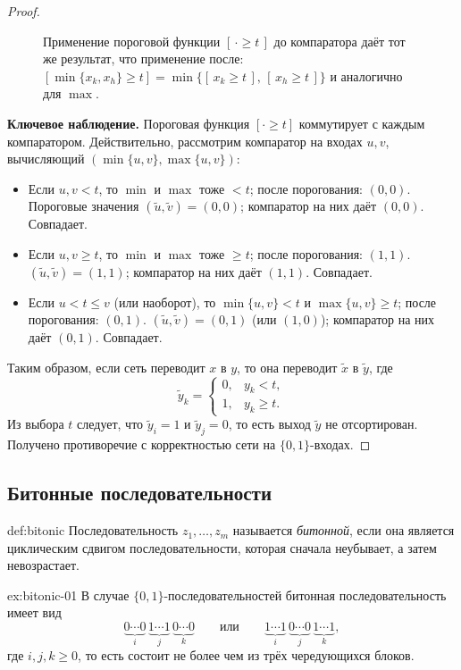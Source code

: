 \begin{proof}
\begin{figure}[H]
\begin{tikzpicture}[>=Stealth, font=\small]
		\end{tikzpicture}
		\caption{
			Применение пороговой функции $[\,\cdot\ge t\,]$ до компаратора
			даёт тот же результат, что применение после:
			$[\min\{x_k,x_h\}\ge t] = \min\{[\,x_k\ge t\,],\,[\,x_h\ge t\,]\}$
			и аналогично для $\max$.}
		\label{fig:zero-one}
	\end{figure}
	
	\textbf{Ключевое наблюдение.} Пороговая функция $[\cdot \ge t]$ коммутирует с каждым компаратором.
	Действительно, рассмотрим компаратор на входах $u,v$, вычисляющий $(\min\{u,v\},\max\{u,v\})$:
	\begin{itemize}
		\item Если $u,v < t$, то $\min$ и $\max$ тоже $<t$; после порогования: $(0,0)$.
		Пороговые значения $(\widetilde u,\widetilde v)=(0,0)$; компаратор на них даёт $(0,0)$. Совпадает.
		\item Если $u,v \ge t$, то $\min$ и $\max$ тоже $\ge t$; после порогования: $(1,1)$.
		$(\widetilde u,\widetilde v)=(1,1)$; компаратор на них даёт $(1,1)$. Совпадает.
		\item Если $u < t \le v$ (или наоборот), то $\min\{u,v\}<t$ и $\max\{u,v\}\ge t$; после порогования: $(0,1)$.
		$(\widetilde u,\widetilde v)=(0,1)$ (или $(1,0)$); компаратор на них даёт $(0,1)$. Совпадает.
	\end{itemize}
	Таким образом, если сеть переводит $x$ в $y$, то она переводит $\widetilde x$ в $\widetilde y$, где
	\[
	\widetilde y_k =
	\begin{cases}
		0, & y_k < t,\\
		1, & y_k \ge t.
	\end{cases}
	\]
	Из выбора $t$ следует, что $\widetilde y_i=1$ и $\widetilde y_j=0$, то есть выход $\widetilde y$ не отсортирован.
	Получено противоречие с корректностью сети на $\{0,1\}$-входах.
\end{proof}

\subsection{Битонные последовательности}

\begin{Definition}{}{def:bitonic}
	Последовательность $z_1,\dots,z_m$ называется \emph{битонной}, если она является циклическим сдвигом последовательности, которая сначала неубывает, а затем невозрастает.
\end{Definition}

\begin{Example}{}{ex:bitonic-01}
	В случае $\{0,1\}$-последовательностей битонная последовательность имеет вид
	\[
	\underbrace{0\cdots 0}_{i}\,\underbrace{1\cdots 1}_{j}\,\underbrace{0\cdots 0}_{k}
	\qquad\text{или}\qquad
	\underbrace{1\cdots 1}_{i}\,\underbrace{0\cdots 0}_{j}\,\underbrace{1\cdots 1}_{k},
	\]
	где $i,j,k\ge 0$, то есть состоит не более чем из трёх чередующихся блоков.
\end{Example}


